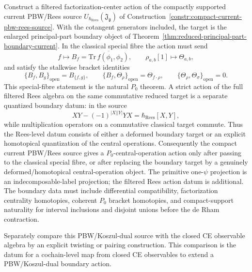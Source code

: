 \documentclass[11pt]{memoir}
\begin{document}
\begin{prob}\label{prob:pbw-p0-center-action}
  Construct a filtered factorization-center action of the compactly
  supported current PBW/Rees source
  $U_{\hbar_{\mathrm{Rees}}}(\mathfrak J_{\mathfrak g})$ of
  Construction~\ref{constr:compact-current-pbw-rees-source}. With the
  cotangent generators included, the target is the enlarged
  principal-part boundary object of
  Theorem~\ref{thm:reduced-principal-part-boundary-current}. In the
  classical special fibre the action must send
  $$f\longmapsto B_f=\overline{\mathrm{Tr}\,f(\phi_1,\phi_2)},\qquad
    \rho_{a,b}[1]\longmapsto\Theta_{a,b},$$
  and satisfy the stalkwise bracket identities
  $$\{B_f,B_g\}_{\mathrm{open}}=B_{\{f,g\}},\qquad
    \{B_f,\Theta_\rho\}_{\mathrm{open}}=\Theta_{f\cdot\rho},\qquad
    \{\Theta_\rho,\Theta_\sigma\}_{\mathrm{open}}=0.$$
  This special-fibre statement is the natural \(P_0\) theorem. A strict action
  of the full filtered Rees algebra on the same commutative reduced target
  is a separate quantized boundary datum: in the source
  $$XY-(-1)^{|X||Y|}YX=\hbar_{\mathrm{Rees}}[X,Y],$$
  while multiplication operators on a commutative classical target commute.
  Thus the Rees-level datum consists of either a deformed boundary target or an
  explicit homotopical quantization of the central operations.  Consequently
  the compact current PBW/Rees source gives a \(P_0\)-central-operation
  action only after passing to the classical special fibre, or after
  replacing the boundary target by a genuinely deformed/homotopical
  central-operation object.  The primitive one-\(\psi\) projection is
  an indecomposable-label projection; the filtered Rees action datum is
  additional.
  The boundary data must include differential compatibility, factorization
  centrality homotopies, coherent $P_0$ bracket homotopies, and
  compact-support naturality for interval inclusions and disjoint unions before
  the de Rham contraction.

  Separately compare this PBW/Koszul-dual source with the closed CE observable
  algebra by an explicit twisting or pairing construction. This
  comparison is the datum for a cochain-level map from
  closed CE observables to extend a PBW/Koszul-dual boundary action.
\end{prob}
\end{document}
